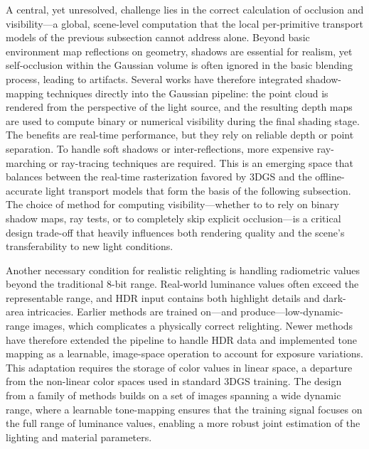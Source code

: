 \documentclass[11pt,a4paper]{article}
\begin{document}
A central, yet unresolved, challenge lies in the correct calculation of occlusion and visibility---a global, scene-level computation that the local per-primitive transport models of the previous subsection cannot address alone. Beyond basic environment map reflections on geometry, shadows are essential for realism, yet self-occlusion within the Gaussian volume is often ignored in the basic blending process, leading to artifacts. Several works have therefore integrated shadow-mapping techniques directly into the Gaussian pipeline: the point cloud is rendered from the perspective of the light source, and the resulting depth maps are used to compute binary or numerical visibility during the final shading stage. The benefits are real-time performance, but they rely on reliable depth or point separation. To handle soft shadows or inter-reflections, more expensive ray-marching or ray-tracing techniques are required. This is an emerging space that balances between the real-time rasterization favored by 3DGS and the offline-accurate light transport models that form the basis of the following subsection. The choice of method for computing visibility---whether to to rely on binary shadow maps, ray tests, or to completely skip explicit occlusion---is a critical design trade-off that heavily influences both rendering quality and the scene's transferability to new light conditions.

Another necessary condition for realistic relighting is handling radiometric values beyond the traditional 8-bit range. Real-world luminance values often exceed the representable range, and HDR input contains both highlight details and dark-area intricacies. Earlier methods are trained on---and produce---low-dynamic-range images, which complicates a physically correct relighting. Newer methods have therefore extended the pipeline to handle HDR data and implemented tone mapping as a learnable, image-space operation to account for exposure variations. This adaptation requires the storage of color values in linear space, a departure from the non-linear color spaces used in standard 3DGS training. The design from a family of methods builds on a set of images spanning a wide dynamic range, where a learnable tone-mapping ensures that the training signal focuses on the full range of luminance values, enabling a more robust joint estimation of the lighting and material parameters.
\end{document}
